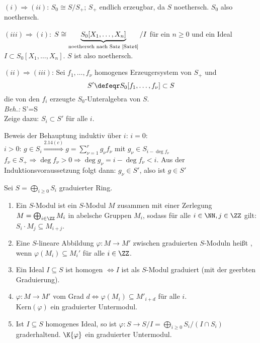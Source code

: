 \begin{Bew}
\glqq$(i)\Rightarrow (ii)$\grqq: $S_0\cong S/S_{+}$; $S_{+}$ endlich erzeugbar, da $S$ noethersch.
$S_0$ also noethersch.

\glqq$(iii)\Rightarrow (i)$\grqq: $S\cong \underbrace{S_0[X_1, \ldots, X_n]}_
{\text{noethersch nach Satz \ref{Satz4}}}/I$ f\"ur ein $n\geq 0$
und ein Ideal $I\subset S_0[X_1, \ldots, X_n]$. $S$ ist also noethersch.

\glqq$(ii)\Rightarrow (iii)$\grqq: Sei $f_1, \ldots, f_\nu$ homogenes Erzeugersystem
von $S_+$ und  
\[
S'\defeqr S_0[f_1, \ldots, f_\nu]\subset S
\]
die von den $f_i$ erzeugte
$S_0$-Unteralgebra von $S$.\\
\emph{Beh.:} S'=S\\
Zeige dazu: $S_i\subset S'$ f\"ur alle $i$.

Beweis der Behauptung induktiv \"uber $i$:
$i=0$: \chk\\
$i> 0$: $g\in S_i\stackrel{2.14(c)}{\Rightarrow}g=\sum_{\nu=1}^{r} g_{\nu}f_\nu$ mit
$g_\nu\in S_{i-\deg{f_\nu}}$\\
$f_\nu\in S_{+} \Rightarrow \deg{f_\nu}> 0 \Rightarrow \deg{g_\nu}=i-\deg{f_\nu} < i$.
Aus der Induktionsvoraussetzung folgt dann: $g_\nu\in S'$, also ist $g\in S'$
\end{Bew}

\begin{DefBem}
\label{2.16} Sei $S=\bigoplus_{i\geq 0}S_i$ graduierter Ring.
\begin{enumerate}

\item Ein  $S$-Modul ist ein $S$-Modul $M$ zusammen mit
einer Zerlegung $M=\bigoplus_{i\in\ZZ} M_i$ in abelsche Gruppen $M_i$,
sodass f\"ur alle $i\in\NN, j\in\ZZ$  gilt:
$S_i\cdot M_j\subseteq M_{i+j}$.

\item Eine $S$-lineare Abbildung $\varphi:M\to M'$ zwischen graduierten $S$-Moduln
hei\ss t , wenn $\varphi(M_i)\subseteq
M_i'$ f\"ur alle $i\in \ZZ$.

\item Ein Ideal $I\subseteq S$ ist homogen $\Leftrightarrow I$ ist als $S$-Modul
graduiert (mit der geerbten Graduierung).

\item $\varphi: M \to M'$ vom Grad $d \Leftrightarrow \varphi(M_i) \subseteq
      M'_{i+d}$ für alle $i$.\\
      Kern$(\varphi)$ ein graduierter Untermodul.
      
\item Ist $I \subseteq S$ homogenes Ideal, so ist $\varphi: S \to S/I =
\bigoplus_{i \ge
0} S_i/(I \cap S_i)$ graderhaltend. $\K{\varphi}$ ein graduierter Untermodul.
\end{enumerate}
\end{DefBem}

